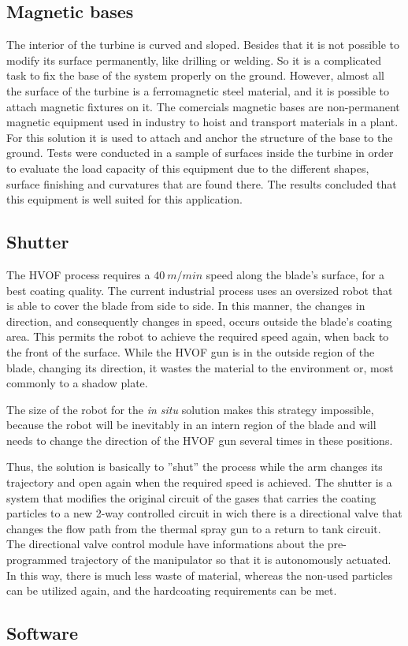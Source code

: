 \subsection{Magnetic bases}

The interior of the turbine is curved and sloped. Besides that it is not
possible to modify its surface permanently, like drilling or welding. 
So it is a complicated task to fix the base of the system properly on the
ground.
However, almost all the surface of the turbine is a ferromagnetic steel
material, and it is possible to attach magnetic fixtures on it.
The comercials magnetic bases are non-permanent magnetic equipment used in
industry to hoist and transport materials in a plant. 
For this solution it is used to attach and anchor the structure of the base to
the ground. 
Tests were conducted in a sample of surfaces inside the turbine in order to
evaluate the load capacity of this equipment due to the different shapes,
surface finishing and curvatures that are found there.
The results concluded that this equipment is well suited for this application.


\subsection{Shutter}

The HVOF process requires a $40~m/min$ speed along the blade's surface, for a
best coating quality. 
The current industrial process uses an oversized robot that is able to
cover the blade from side to side. In this manner, the changes in direction, and
consequently changes in speed, occurs outside the blade's coating area.
This permits the robot to achieve the required speed again, when back to the
front of the surface.
While the HVOF gun is in the outside region of the blade, changing its
direction, it wastes the material to the environment or, most commonly to a
shadow plate.

The size of the robot for the \textit{in situ} solution makes this strategy
impossible, because the robot will be inevitably in an intern region of the blade and will
needs to change the direction of the HVOF gun several times in these
positions. 

Thus, the solution is basically to ''shut'' the process while the arm changes
its trajectory and open again when the required speed is achieved.
The shutter is a system that modifies the original circuit of the gases that
carries the coating particles to a new 2-way controlled circuit in wich there 
is a directional valve that changes the flow path from the thermal spray gun to
a return to tank circuit. 
The directional valve control module have informations about the pre-programmed
trajectory of the manipulator so that it is autonomously actuated.
In this way, there is much less waste of material, whereas the non-used
particles can be utilized again, and the hardcoating requirements can be met.


\subsection{Software}